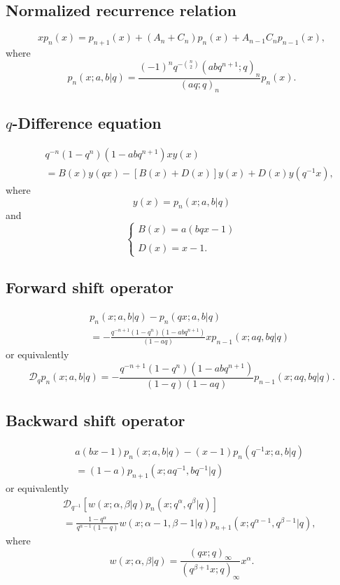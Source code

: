 \documentclass[envcountchap,graybox]{svmono}
\begin{document}
\subsection*{Normalized recurrence relation}
\begin{equation}
\label{NormRecLittleqJacobi}
xp_n(x)=p_{n+1}(x)+(A_n+C_n)p_n(x)+A_{n-1}C_np_{n-1}(x),\end{equation}
where
$$p_n(x;a,b|q)=\frac{(-1)^nq^{-\binom{n}{2}}(abq^{n+1};q)_n}{(aq;q)_n}p_n(x).$$

\subsection*{$q$-Difference equation}
\begin{eqnarray}
\label{dvLittleqJacobi}
& &q^{-n}(1-q^n)(1-abq^{n+1})xy(x)\nonumber\\
& &{}=B(x)y(qx)-\left[B(x)+D(x)\right]y(x)+D(x)y(q^{-1}x),
\end{eqnarray}
where
$$y(x)=p_n(x;a,b|q)$$
and
$$\left\{\begin{array}{l}\displaystyle B(x)=a(bqx-1)\\
\\
\displaystyle D(x)=x-1.\end{array}\right.$$

\subsection*{Forward shift operator}
\begin{eqnarray}
\label{shift1LittleqJacobiI}
& &p_n(x;a,b|q)-p_n(qx;a,b|q)\nonumber\\
& &{}=-\frac{q^{-n+1}(1-q^n)(1-abq^{n+1})}{(1-aq)}xp_{n-1}(x;aq,bq|q)
\end{eqnarray}
or equivalently
\begin{equation}
\label{shift1LittleqJacobiII}
\mathcal{D}_qp_n(x;a,b|q)=-\frac{q^{-n+1}(1-q^n)(1-abq^{n+1})}
{(1-q)(1-aq)}p_{n-1}(x;aq,bq|q).
\end{equation}

\subsection*{Backward shift operator}
\begin{eqnarray}
\label{shift2LittleqJacobiI}
& &a(bx-1)p_n(x;a,b|q)-(x-1)p_n(q^{-1}x;a,b|q)\nonumber\\
& &{}=(1-a)p_{n+1}(x;aq^{-1},bq^{-1}|q)
\end{eqnarray}
or equivalently
\begin{eqnarray}
\label{shift2LittleqJacobiII}
& &\mathcal{D}_{q^{-1}}\left[w(x;\alpha,\beta|q)p_n(x;q^{\alpha},q^{\beta}|q)\right]\nonumber\\
& &{}=\frac{1-q^{\alpha}}{q^{\alpha-1}(1-q)}w(x;\alpha-1,\beta-1|q)p_{n+1}(x;q^{\alpha-1},q^{\beta-1}|q),
\end{eqnarray}
where
$$w(x;\alpha,\beta|q)=\frac{(qx;q)_{\infty}}{(q^{\beta+1}x;q)_{\infty}}x^{\alpha}.$$
\end{document}
